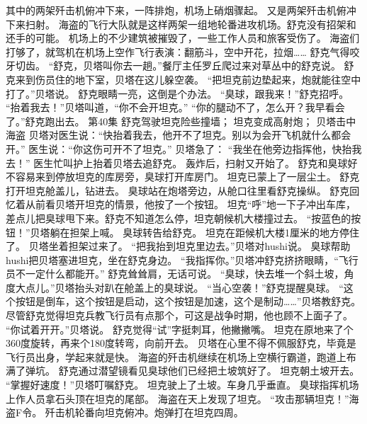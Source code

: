 \documentclass[a4paper,12pt,UTF8,twoside]{ctexbook}
\begin{document}
        其中的两架歼击机俯冲下来，一阵排炮，机场上硝烟骤起。 
        又是两架歼击机俯冲下来扫射。 
        海盗的飞行大队就是这样两架一组地轮番进攻机场。舒克没有招架和还手的可能。 
        机场上的不少建筑被摧毁了，一些工作人员和旅客受伤了。 
        海盗们打够了，就驾机在机场上空作飞行表演：翻筋斗，空中开花，拉烟…… 
        舒克气得咬牙切齿。 
        “舒克，贝塔叫你去一趟。”餐厅主任罗丘爬过来对草丛中的舒克说。 
        舒克来到伤员住的地下室，贝塔在这儿躲空袭。 
        “把坦克前边垫起来，炮就能往空中打了。”贝塔说。 
        舒克眼睛一亮，这倒是个办法。 
        “臭球，跟我来！”舒克招呼。 
        “抬着我去！”贝塔叫道，“你不会开坦克。” 
        “你的腿动不了，怎么开？我早看会了。”舒克跑出去。   第40集 
        舒克驾驶坦克险些撞墙； 
        坦克变成高射炮； 
        贝塔击中海盗   
        贝塔对医生说：“快抬着我去，他开不了坦克。别以为会开飞机就什么都会开。” 
        医生说：“你这伤可开不了坦克。” 
        贝塔急了：  “我坐在他旁边指挥他，快抬我去！” 
        医生忙叫护上抬着贝塔去追舒克。 
        轰炸后，扫射又开始了。 
        舒克和臭球好不容易来到停放坦克的库房旁，臭球打开库房门。 
        坦克已蒙上了一层尘土。 
        舒克打开坦克舱盖儿，钻进去。 
        臭球站在炮塔旁边，从舱口往里看舒克操纵。 
        舒克回忆着从前看贝塔开坦克的情景，他按了一个按钮。 
        坦克“呼”地一下子冲出车库，差点儿把臭球甩下来。舒克不知道怎么停，坦克朝候机大楼撞过去。 
        “按蓝色的按钮！”贝塔躺在担架上喊。 
        臭球转告给舒克。 
        坦克在距候机大楼1厘米的地方停住了。 
        贝塔坐着担架过来了。 
        “把我抬到坦克里边去。”贝塔对hushi说。 
        臭球帮助hushi把贝塔塞进坦克，坐在舒克身边。 
        “我指挥你。”贝塔冲舒克挤挤眼睛，“飞行员不一定什么都能开。” 
        舒克耸耸肩，无话可说。 
        “臭球，快去堆一个斜土坡，角度大点儿。”贝塔抬头对趴在舱盖上的臭球说。 
        “当心空袭！”舒克提醒臭球。 
        “这个按钮是倒车，这个按钮是启动，这个按钮是加速，这个是制动……”贝塔教舒克。 
        尽管舒克觉得坦克兵教飞行员有点那个，可这是战争时期，他也顾不上面子了。 
        “你试着开开。”贝塔说。 
        舒克觉得“试”字挺刺耳，他撇撇嘴。 
        坦克在原地来了个360度旋转，再来个180度转弯，向前开去。 
        贝塔在心里不得不佩服舒克，毕竟是飞行员出身，学起来就是快。 
        海盗的歼击机继续在机场上空横行霸道，跑道上布满了弹坑。 
        舒克通过潜望镜看见臭球他们已经把土坡筑好了。 
        坦克朝土坡开去。 
        “掌握好速度！”贝塔叮嘱舒克。 
        坦克驶上了土坡。车身几乎垂直。 
        臭球指挥机场上作人员拿石头顶在坦克的尾部。 
        海盗在天上发现了坦克。 
        “攻击那辆坦克！”海盗F令。 
        歼击机轮番向坦克俯冲。炮弹打在坦克四周。 
\end{document}
